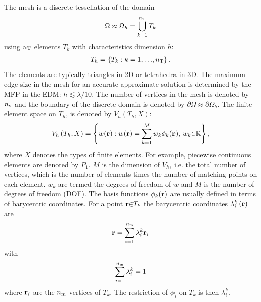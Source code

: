 \documentclass[a4paper]{article}
\numberwithin{equation}{section}
\begin{document}
The mesh is a discrete tessellation of the domain
\begin{align}
\Omega \approx \Omega_h= \bigcup_{k=1}^{n_{\mathrm{T}}} T_k
\end{align}
using $n_{\mathrm{T}}$ elements $T_k$ with characteristics dimension $h$:
\begin{align}
T_h = \left\{T_k:k=1,{\dots},n_{\mathrm{T}}\right\}.
\end{align}
The elements are typically triangles in 2D or tetrahedra in 3D. The maximum edge size 
in the mesh for an accurate approximate solution is determined by the MFP in the EDM: $h\lesssim\lambda/10$.
The number of vertices in the mesh is denoted by $n_{\mathrm{v}}$ and the boundary of the
discrete domain is denoted by $\partial\Omega\approx\partial\Omega_h$. The finite element
space on $T_h$, is denoted by $V_h\left(T_h,X\right)$:
\begin{align}
V_h\left(T_h,X\right)=\left\{w(\boldsymbol{\mathrm{r}}):w(\boldsymbol{\mathrm{r}})=\sum_{k=1}^M w_k\phi_k(\boldsymbol{\mathrm{r}}),\,w_k{\in}\mathbb{R}\right\},
\end{align}
where $X$ denotes the types of finite elements. For example, piecewise continuous elements 
are denoted by $P_1$. $M$ is the dimension of $V_h$, i.e. the total number of vertices, 
which is the number of elements times the number of matching points on each 
element. $w_k$ are termed the degrees of freedom of $w$ and $M$ is the number 
of degrees of freedom (DOF). The basis functions $\phi_k(\boldsymbol{\mathrm{r}})$ are usually defined in terms 
of barycentric coordinates. For a point $\boldsymbol{\mathrm{r}}{\in}T_k$ the barycentric coordinates  
$\lambda_i^k\left(\boldsymbol{\mathrm{r}}\right)$ are
\begin{align}
\boldsymbol{\mathrm{r}} = \sum_{i=1}^{n_{\mathrm{m}}} \lambda_i^k \boldsymbol{\mathrm{r}}_i
\end{align}
with
\begin{equation*}
\sum_{i=1}^{n_{\mathrm{m}}} \lambda _i^k=1
\end{equation*}
where $\boldsymbol{\mathrm{r}}_i$ are the $n_{\mathrm{m}}$ vertices of $T_k$. The restriction of $\phi_i$ on $T_k$ is then $\lambda_i^k$.
\end{document}
